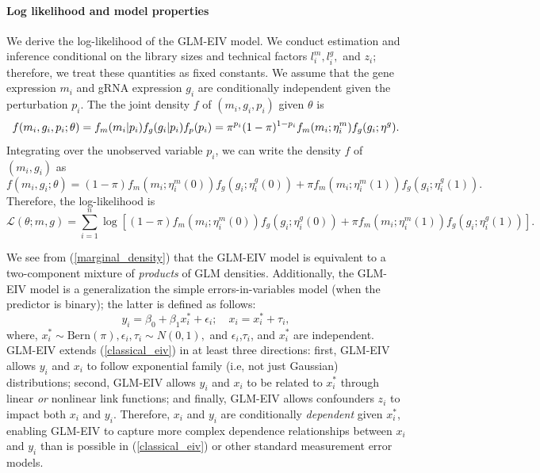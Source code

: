 \documentclass[12pt]{article}
\begin{document}
\paragraph{Log likelihood and model properties} We derive the log-likelihood of the GLM-EIV model. We conduct estimation and inference conditional on the library sizes and technical factors $l^m_i, l^g_i,$ and $z_i$; therefore, we treat these quantities as fixed constants. We assume that the gene expression $m_i$ and gRNA expression $g_i$ are conditionally independent given the perturbation $p_i$. The the joint density $f$ of $(m_i, g_i, p_i)$ given $\theta$ is $ $
\begin{equation}\label{full_density}
f(m_i,g_i,p_i; \theta) = f_m(m_i | p_i) f_g(g_i | p_i) f_p(p_i) \\ = \pi^{p_i}(1-\pi)^{1-p_i} f_m(m_i; \eta^m_i) f_g(g_i; \eta^g).
\end{equation}
Integrating over the unobserved variable $p_i$, we can write the density $f$ of $(m_i, g_i)$ as
\begin{equation}\label{marginal_density}
f(m_i, g_i; \theta) = (1-\pi) f_m(m_i; \eta^m_i(0)) f_g(g_i; \eta^g_i(0)) + \pi f_m(m_i; \eta^m_i(1)) f_g(g_i; \eta^g_i(1)).
\end{equation}
Therefore, the log-likelihood is
\begin{equation}\label{marginal_log_lik}
\mathcal{L}(\theta; m, g) = \sum_{i=1}^n \log\left[(1-\pi) f_m(m_i; \eta^m_i(0)) f_g(g_i; \eta^g_i(0)) + \pi f_m(m_i; \eta^m_i(1)) f_g(g_i; \eta^g_i(1)) \right].
\end{equation}

We see from (\ref{marginal_density}) that the GLM-EIV model is equivalent to a two-component mixture of \textit{products} of GLM densities. Additionally, the GLM-EIV model is a generalization the simple errors-in-variables model (when the predictor is binary); the latter is defined as follows:
\begin{equation}\label{classical_eiv}
y_i = \beta_0 + \beta_1 x^*_i + \epsilon_i; \quad
x_i = x^*_i + \tau_i,
\end{equation}
where, $x^*_i \sim \textrm{Bern}(\pi), \epsilon_i, \tau_i \sim N(0,1),$ and $\epsilon_i$,$\tau_i$, and $x^*_i$ are independent. GLM-EIV extends (\ref{classical_eiv}) in at least three directions: first, GLM-EIV allows $y_i$ and $x_i$ to follow exponential family (i.e, not just Gaussian) distributions; second, GLM-EIV allows $y_i$ and $x_i$ to be related to $x^*_i$ through linear \textit{or} nonlinear link functions; and finally, GLM-EIV allows confounders $z_i$ to impact both $x_i$ and $y_i$. Therefore, $x_i$ and $y_i$ are conditionally \textit{dependent} given $x^*_i$, enabling GLM-EIV to capture more complex dependence relationships between $x_i$ and $y_i$ than is possible in (\ref{classical_eiv}) or other standard measurement error models.
\end{document}
